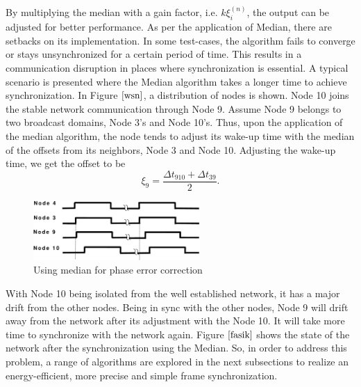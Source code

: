 \documentclass[journal]{IEEEtran}
\begin{document}
By multiplying the median with a gain factor,
i.e. $k\xi_i^{(n)}$, the output can be adjusted for better
performance. 
\newline As per the application of Median,
there are setbacks on its implementation. In some test-cases, the
algorithm fails to converge or stays unsynchronized for a certain
period of time. This results in a  communication disruption
in places where synchronization is essential.
\newline A typical scenario is presented where the Median
algorithm takes a longer time to achieve synchronization. In Figure
$\ref{wsn}$, a distribution of nodes is shown. Node 10 joins 
the stable network communication through Node 9. Assume Node
9 belongs to two broadcast domains, Node 3's and Node 10's. Thus,
upon the application of the median algorithm, the node tends to
adjust its wake-up time with the median of the offsets from its
neighbors, Node 3 and Node 10. Adjusting the wake-up time, we get
the offset to be
\begin{equation}
\xi_9 = \frac{\Delta t_{910} + \Delta t_{39}}{2}.
\end{equation}
\begin{figure}[t]
\centering
\includegraphics[width= 2.5in]{offsetpic}
\caption{Using median for phase error correction} \label{fasik}
\end{figure}
 With Node 10 being isolated from the well established
network, it has a major drift from the other nodes. Being in sync
with the other nodes, Node 9 will drift away from the network after
its adjustment with the Node 10. It will take more time to
synchronize with the network again. Figure $\ref{fasik}$ shows the state of the network after the
synchronization using the Median. 
\newline So, in order to address this problem, a range of
algorithms are explored in the next subsections to realize an
energy-efficient, more precise and simple frame
synchronization.
\end{document}
